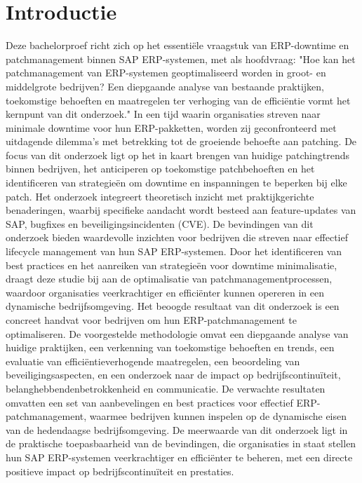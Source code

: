 
\section{Introductie}%
\label{sec:introductie}

Deze bachelorproef richt zich op het essentiële vraagstuk van ERP-downtime en patchmanagement binnen SAP ERP-systemen, met als hoofdvraag: "Hoe kan het patchmanagement van ERP-systemen geoptimaliseerd worden in groot- en middelgrote bedrijven?
 Een diepgaande analyse van bestaande praktijken, toekomstige behoeften en maatregelen ter verhoging van de efficiëntie vormt het kernpunt van dit onderzoek." In een tijd waarin organisaties streven naar minimale downtime voor hun ERP-pakketten,
 worden zij geconfronteerd met uitdagende dilemma's met betrekking tot de groeiende behoefte aan patching. De focus van dit onderzoek ligt op het in kaart brengen van huidige patchingtrends binnen bedrijven, 
 het anticiperen op toekomstige patchbehoeften en het identificeren van strategieën om downtime en inspanningen te beperken bij elke patch. Het onderzoek integreert theoretisch inzicht met praktijkgerichte benaderingen, waarbij specifieke aandacht wordt besteed aan feature-updates van SAP, 
 bugfixes en beveiligingsincidenten (CVE). De bevindingen van dit onderzoek bieden waardevolle inzichten voor bedrijven die streven naar effectief lifecycle management van hun SAP ERP-systemen. Door het identificeren van best practices en het aanreiken van strategieën voor downtime minimalisatie, 
 draagt deze studie bij aan de optimalisatie van patchmanagementprocessen, waardoor organisaties veerkrachtiger en efficiënter kunnen opereren in een dynamische bedrijfsomgeving. Het beoogde resultaat van dit onderzoek is een concreet handvat voor bedrijven om hun ERP-patchmanagement te optimaliseren. 
 De voorgestelde methodologie omvat een diepgaande analyse van huidige praktijken, een verkenning van toekomstige behoeften en trends, 
een evaluatie van efficiëntieverhogende maatregelen, een beoordeling van beveiligingsaspecten, en een onderzoek naar de impact op bedrijfscontinuïteit, belanghebbendenbetrokkenheid en communicatie. De verwachte resultaten omvatten een set van aanbevelingen en best practices voor effectief ERP-patchmanagement, 
waarmee bedrijven kunnen inspelen op de dynamische eisen van de hedendaagse bedrijfsomgeving. De meerwaarde van dit onderzoek ligt in de praktische toepasbaarheid van de bevindingen, die organisaties in staat stellen hun SAP ERP-systemen veerkrachtiger en efficiënter te beheren, met een directe positieve impact op bedrijfscontinuïteit en prestaties.


